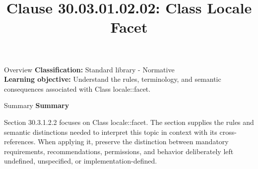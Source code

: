 \documentclass[10pt,letterpaper]{article}
\title{Clause 30.03.01.02.02: Class Locale Facet}
\author{}
\date{}
\begin{document}
\maketitle
\begin{CornellOverviewBox}{Overview}
\textbf{Classification:} Standard library - Normative\\[2pt]
\textbf{Learning objective:} Understand the rules, terminology, and semantic consequences associated with Class locale::facet.
\end{CornellOverviewBox}\begin{CornellSummaryBox}{Summary}
{\sffamily\bfseries\color{Accent} Summary}\par\vspace{3pt}Section 30.3.1.2.2 focuses on Class locale::facet. The section supplies the rules and semantic distinctions needed to interpret this topic in context with its cross-references. When applying it, preserve the distinction between mandatory requirements, recommendations, permissions, and behavior deliberately left undefined, unspecified, or implementation-defined.
\end{CornellSummaryBox}
\end{document}
